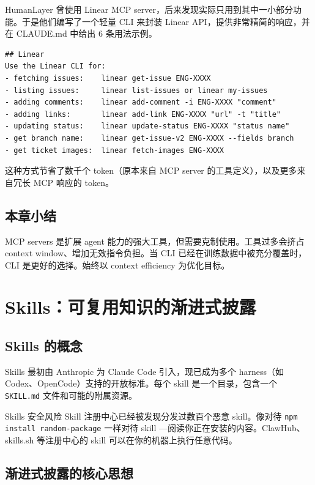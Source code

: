 \documentclass[a4paper]{article}
\begin{document}
HumanLayer 曾使用 Linear MCP server，后来发现实际只用到其中一小部分功能。于是他们编写了一个轻量 CLI 来封装 Linear API，提供非常精简的响应，并在 CLAUDE.md 中给出 6 条用法示例。

\begin{lstlisting}[caption={CLAUDE.md 中的 Linear CLI 示例配置},language={}]
## Linear
Use the Linear CLI for:
- fetching issues:    linear get-issue ENG-XXXX
- listing issues:     linear list-issues or linear my-issues
- adding comments:    linear add-comment -i ENG-XXXX "comment"
- adding links:       linear add-link ENG-XXXX "url" -t "title"
- updating status:    linear update-status ENG-XXXX "status name"
- get branch name:    linear get-issue-v2 ENG-XXXX --fields branch
- get ticket images:  linear fetch-images ENG-XXXX
\end{lstlisting}

这种方式节省了数千个 token（原本来自 MCP server 的工具定义），以及更多来自冗长 MCP 响应的 token。

\subsection{本章小结}

MCP servers 是扩展 agent 能力的强大工具，但需要克制使用。工具过多会挤占 context window、增加无效指令负担。当 CLI 已经在训练数据中被充分覆盖时，CLI 是更好的选择。始终以 context efficiency 为优化目标。


\section{Skills：可复用知识的渐进式披露}

\subsection{Skills 的概念}

Skills 最初由 Anthropic 为 Claude Code 引入，现已成为多个 harness（如 Codex、OpenCode）支持的开放标准。每个 skill 是一个目录，包含一个 \texttt{SKILL.md} 文件和可能的附属资源。

\begin{warningbox}{Skills 安全风险}
Skill 注册中心已经被发现分发过数百个恶意 skill。像对待 \texttt{npm install random-package} 一样对待 skill ---阅读你正在安装的内容。ClawHub、skills.sh 等注册中心的 skill 可以在你的机器上执行任意代码。
\end{warningbox}

\subsection{渐进式披露的核心思想}
\end{document}
